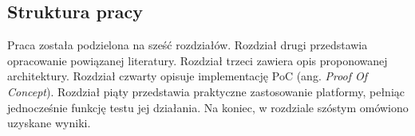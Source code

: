 \subsection{Struktura pracy}
Praca została podzielona na sześć rozdziałów. Rozdział drugi przedstawia opracowanie powiązanej literatury. Rozdział trzeci zawiera opis proponowanej architektury. Rozdział czwarty opisuje implementację PoC (ang. \textit{Proof Of Concept}). Rozdział piąty przedstawia praktyczne zastosowanie platformy, pełniąc jednocześnie funkcję testu jej działania. Na koniec, w rozdziale szóstym omówiono uzyskane wyniki.